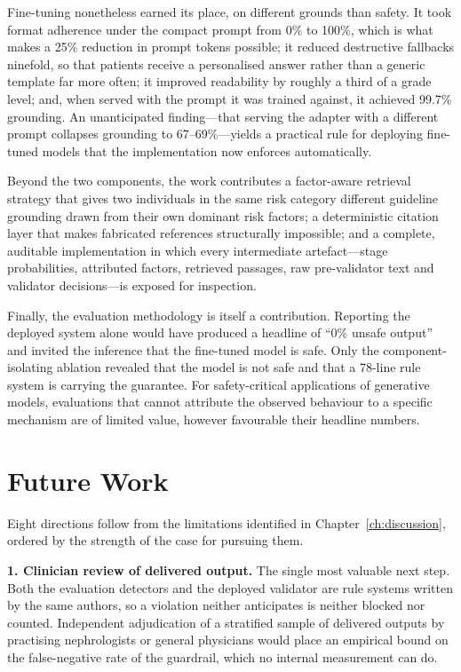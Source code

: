 Fine-tuning nonetheless earned its place, on different grounds than safety. It
took format adherence under the compact prompt from 0\% to 100\%, which is what
makes a 25\% reduction in prompt tokens possible; it reduced destructive
fallbacks ninefold, so that patients receive a personalised answer rather than a
generic template far more often; it improved readability by roughly a third of
a grade level; and, when served with the prompt it was trained against, it
achieved 99.7\% grounding. An unanticipated finding---that serving the adapter
with a different prompt collapses grounding to 67--69\%---yields a practical rule
for deploying fine-tuned models that the implementation now enforces
automatically.

Beyond the two components, the work contributes a factor-aware retrieval
strategy that gives two individuals in the same risk category different
guideline grounding drawn from their own dominant risk factors; a deterministic
citation layer that makes fabricated references structurally impossible; and a
complete, auditable implementation in which every intermediate artefact---stage
probabilities, attributed factors, retrieved passages, raw pre-validator text
and validator decisions---is exposed for inspection.

Finally, the evaluation methodology is itself a contribution. Reporting the
deployed system alone would have produced a headline of ``0\% unsafe output'' and
invited the inference that the fine-tuned model is safe. Only the
component-isolating ablation revealed that the model is not safe and that a
78-line rule system is carrying the guarantee. For safety-critical applications
of generative models, evaluations that cannot attribute the observed behaviour
to a specific mechanism are of limited value, however favourable their headline
numbers.

\section{Future Work}
\label{sec:future}

Eight directions follow from the limitations identified in
Chapter~\ref{ch:discussion}, ordered by the strength of the case for pursuing
them.

\textbf{1. Clinician review of delivered output.} The single most valuable next
step. Both the evaluation detectors and the deployed validator are rule systems
written by the same authors, so a violation neither anticipates is neither
blocked nor counted. Independent adjudication of a stratified sample of
delivered outputs by practising nephrologists or general physicians would place
an empirical bound on the false-negative rate of the guardrail, which no
internal measurement can do.

